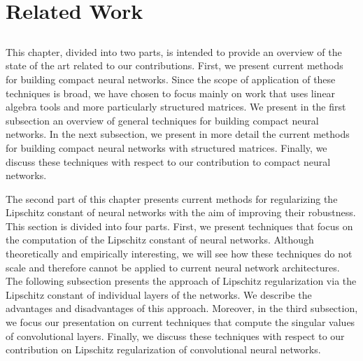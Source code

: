 \chapter{Related Work}
\label{chapter:ch3-related_work}
\localtoc

\section*{}

This chapter, divided into two parts, is intended to provide an overview of the state of the art related to our contributions.
First, we present current methods for building compact neural networks.
Since the scope of application of these techniques is broad, we have chosen to focus mainly on work that uses linear algebra tools and more particularly structured matrices. 
We present in the first subsection an overview of general techniques for building compact neural networks.
In the next subsection, we present in more detail the current methods for building compact neural networks with structured matrices.
Finally, we discuss these techniques with respect to our contribution to compact neural networks.

The second part of this chapter presents current methods for regularizing the Lipschitz constant of neural networks with the aim of improving their robustness.
This section is divided into four parts.
First, we present techniques that focus on the computation of the Lipschitz constant of neural networks.
Although theoretically and empirically interesting, we will see how these techniques do not scale and therefore cannot be applied to current neural network architectures.
The following subsection presents the approach of Lipschitz regularization via the Lipschitz constant of individual layers of the networks.
We describe the advantages and disadvantages of this approach.
Moreover, in the third subsection, we focus our presentation on current techniques that compute the singular values of convolutional layers.
Finally, we discuss these techniques with respect to our contribution on Lipschitz regularization of convolutional neural networks.




